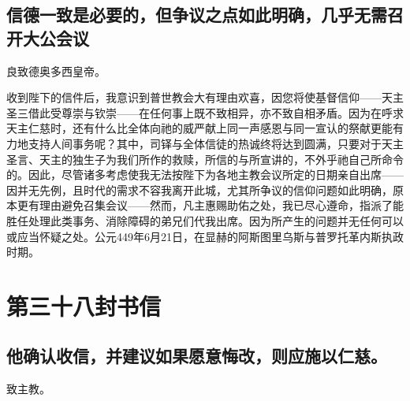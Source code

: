 
\subsection{信德一致是必要的，但争议之点如此明确，几乎无需召开大公会议}

良致德奥多西皇帝。\par

收到陛下的信件后，我意识到普世教会大有理由欢喜，因您将使基督信仰——天主圣三借此受尊崇与钦崇——在任何事上既不致相异，亦不致自相矛盾。因为在呼求天主仁慈时，还有什么比全体向祂的威严献上同一声感恩与同一宣认的祭献更能有力地支持人间事务呢？其中，司铎与全体信徒的热诚终将达到圆满，只要对于天主圣言、天主的独生子为我们所作的救赎，所信的与所宣讲的，不外乎祂自己所命令的。因此，尽管诸多考虑使我无法按陛下为各地主教会议所定的日期亲自出席——因并无先例，且时代的需求不容我离开此城，尤其所争议的信仰问题如此明确，原本更有理由避免召集会议——然而，凡主惠赐助佑之处，我已尽心遵命，指派了能胜任处理此类事务、消除障碍的弟兄们代我出席。因为所产生的问题并无任何可以或应当怀疑之处。公元449年6月21日，在显赫的阿斯图里乌斯与普罗托革内斯执政时期。\par



\section{第三十八封书信}


\subsection{他确认收信，并建议如果愿意悔改，则应施以仁慈。}

致主教。\par

